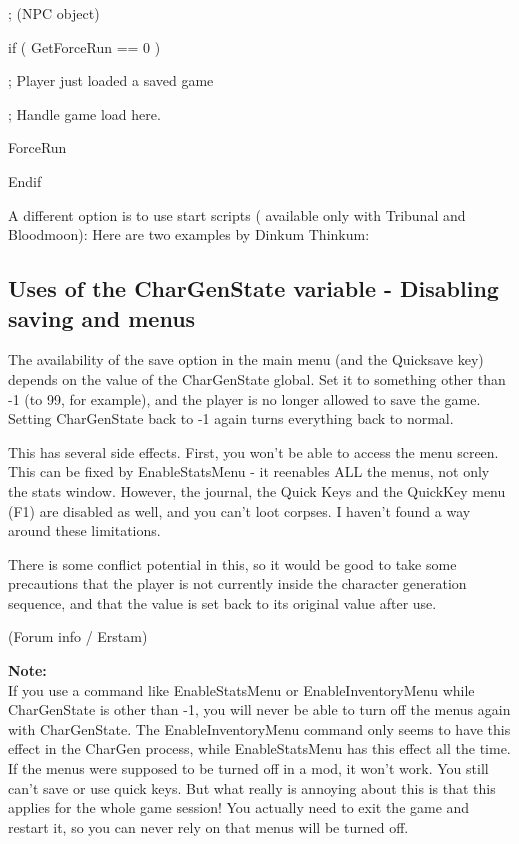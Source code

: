 \documentclass[
]{article}
\begin{document}
; (NPC object)

if ( GetForceRun == 0 )

; Player just loaded a saved game

; Handle game load here.

ForceRun

Endif

A different option is to use start scripts ( available only with
Tribunal and Bloodmoon): Here are two examples by Dinkum Thinkum:





\hypertarget{uses-of-the-chargenstate-variable---disabling-saving-and-menus}{%
\subsection{Uses of the CharGenState variable - Disabling saving and
menus}\label{uses-of-the-chargenstate-variable---disabling-saving-and-menus}}

The availability of the save option in the main menu (and the Quicksave
key) depends on the value of the CharGenState global. Set it to
something other than -1 (to 99, for example), and the player is no
longer allowed to save the game. Setting CharGenState back to -1 again
turns everything back to normal.

This has several side effects. First, you won't be able to access the
menu screen. This can be fixed by EnableStatsMenu - it reenables ALL the
menus, not only the stats window. However, the journal, the Quick Keys
and the QuickKey menu (F1) are disabled as well, and you can't loot
corpses. I haven't found a way around these limitations.

There is some conflict potential in this, so it would be good to take
some precautions that the player is not currently inside the character
generation sequence, and that the value is set back to its original
value after use.

(Forum info / Erstam)

\textbf{Note:\\
}If you use a command like EnableStatsMenu or EnableInventoryMenu while
CharGenState is other than -1, you will never be able to turn off the
menus again with CharGenState. The EnableInventoryMenu command only
seems to have this effect in the CharGen process, while EnableStatsMenu
has this effect all the time. If the menus were supposed to be turned
off in a mod, it won't work. You still can't save or use quick keys. But
what really is annoying about this is that this applies for the whole
game session! You actually need to exit the game and restart it, so you
can never rely on that menus will be turned off.
\end{document}
